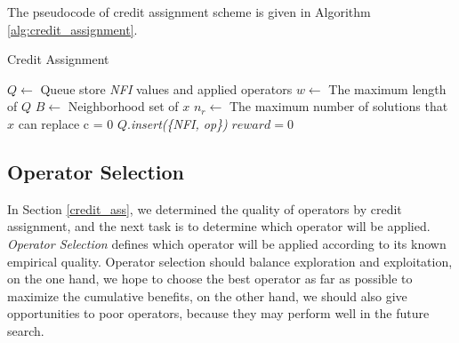 \documentclass[journal]{IEEEtran}
\begin{document}
The pseudocode of credit assignment scheme is given in Algorithm \ref{alg:credit_assignment}.
\begin{algorithm}[t]
  \caption{Credit Assignment}
  \small
  $Q \leftarrow $ Queue store \textit{NFI} values and applied operators\;  %
  $w \leftarrow $ The maximum length of $Q$\;
  $B \leftarrow $ Neighborhood set of $x$\;
  $n_r \leftarrow$ The maximum number of solutions that $x$ can replace\;
  c = 0\;  %
  $Q$.\textit{insert(\{NFI, op\})}\;
  $\textit{reward} = 0$\;
  \;
  \label{alg:credit_assignment}
\end{algorithm}

\subsection{Operator Selection \label{operator_selection}}
In Section \ref{credit_ass}, we determined the quality of operators by credit assignment, and the next task is to determine which operator will be applied. \textit{Operator Selection} defines which operator will be applied according to its known empirical quality.
Operator selection should balance exploration and exploitation, on the one hand, we hope to choose the best operator as far as possible to maximize the cumulative benefits, on the other hand, we should also give opportunities to poor operators, because they may perform well in the future search.
\end{document}
